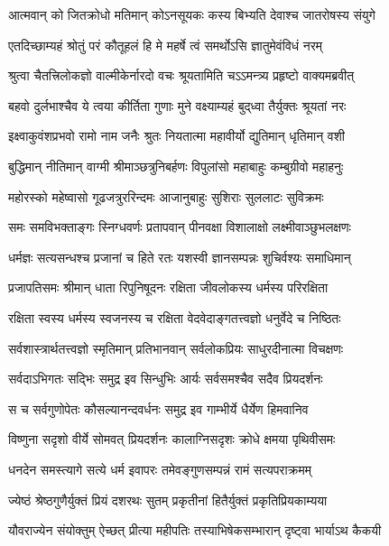 \twolineshloka
{आत्मवान् को जितक्रोधो मतिमान् कोऽनसूयकः}
{कस्य बिभ्यति देवाश्च जातरोषस्य संयुगे}%

\twolineshloka
{एतदिच्छाम्यहं श्रोतुं परं कौतूहलं हि मे}
{महर्षे त्वं समर्थोऽसि ज्ञातुमेवंविधं नरम्}%

\twolineshloka
{श्रुत्वा चैतत्त्रिलोकज्ञो वाल्मीकेर्नारदो वचः}
{श्रूयतामिति चऽऽमन्त्र्य प्रहृष्टो वाक्यमब्रवीत्}%

\twolineshloka
{बहवो दुर्लभाश्चैव ये त्वया कीर्तिता गुणाः}
{मुने वक्ष्याम्यहं बुद्‌ध्वा तैर्युक्तः श्रूयतां नरः}%

\twolineshloka
{इक्ष्वाकुवंशप्रभवो रामो नाम जनैः श्रुतः}
{नियतात्मा महावीर्यो द्युतिमान् धृतिमान् वशी}%

\twolineshloka
{बुद्धिमान् नीतिमान् वाग्मी श्रीमाञ्छत्रुनिबर्हणः}
{विपुलांसो महाबाहुः कम्बुग्रीवो महाहनुः}%

\twolineshloka
{महोरस्को महेष्वासो गूढजत्रुररिन्दमः}
{आजानुबाहुः सुशिराः सुललाटः सुविक्रमः}%

\twolineshloka
{समः समविभक्ताङ्गः स्निग्धवर्णः प्रतापवान्}
{पीनवक्षा विशालाक्षो लक्ष्मीवाञ्छुभलक्षणः}%

\twolineshloka
{धर्मज्ञः सत्यसन्धश्च प्रजानां च हिते रतः}
{यशस्वी ज्ञानसम्पन्नः शुचिर्वश्यः समाधिमान्}%

\twolineshloka
{प्रजापतिसमः श्रीमान् धाता रिपुनिषूदनः}
{रक्षिता जीवलोकस्य धर्मस्य परिरक्षिता}%

\twolineshloka
{रक्षिता स्वस्य धर्मस्य स्वजनस्य च रक्षिता}
{वेदवेदाङ्गतत्त्वज्ञो धनुर्वेदे च निष्ठितः}%

\twolineshloka
{सर्वशास्त्रार्थतत्त्वज्ञो स्मृतिमान् प्रतिभानवान्}
{सर्वलोकप्रियः साधुरदीनात्मा विचक्षणः}%

\twolineshloka
{सर्वदाऽभिगतः सद्भिः समुद्र इव सिन्धुभिः}
{आर्यः सर्वसमश्चैव सदैव प्रियदर्शनः}%

\twolineshloka
{स च सर्वगुणोपेतः कौसल्यानन्दवर्धनः}
{समुद्र इव गाम्भीर्ये धैर्येण हिमवानिव}%

\twolineshloka
{विष्णुना सदृशो वीर्ये सोमवत् प्रियदर्शनः}
{कालाग्निसदृशः क्रोधे क्षमया पृथिवीसमः}%

\twolineshloka
{धनदेन समस्त्यागे सत्ये धर्म इवापरः}
{तमेवङ्गुणसम्पन्नं रामं सत्यपराक्रमम्}%

\twolineshloka
{ज्येष्ठं श्रेष्ठगुणैर्युक्तं प्रियं दशरथः सुतम्}
{प्रकृतीनां हितैर्युक्तं प्रकृतिप्रियकाम्यया}%

\twolineshloka
{यौवराज्येन संयोक्तुम् ऐच्छत् प्रीत्या महीपतिः}
{तस्याभिषेकसम्भारान् दृष्ट्वा भार्याऽथ कैकयी}%

